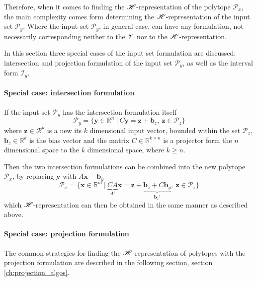 Therefore, when it comes to finding the $\mathscr{H}$-representation of the polytope $\mathcal{P}_x$, the main complexity comes form determining the $\mathscr{H}$-representation of the input set $\mathcal{P}_y$. Where the input set $\mathcal{P}_y$, in general case, can have any formulation, not necessarily corresponding neither to the $\mathscr{V}$ nor to the $\mathscr{H}$-representation.

In this section three special cases of the input set formulation are discussed: intersection and projection formulation of the input set $\mathcal{P}_y$, as well as the interval form $\mathcal{I}_y$.

\paragraph*{Special case: intersection formulation} If the input set $\mathcal{P}_y$ has the intersection formulation itself
\begin{equation}
    \mathcal{P}_y=\{\bm{y}\in  \mathbb{R}^n~|~ C\bm{y}=\bm{z} + \bm{b}_z, ~ \bm{z} \in \mathcal{P}_z \}
\end{equation}
where $\bm{z}\in\mathcal{R}^k$ is a new its $k$ dimensional input vector, bounded within the set $\mathcal{P}_z$, $\bm{b}_z\in\mathbb{R}^k$ is the bias vector and the matrix $C\in \mathbb{R}^{k\times n}$ is a projector form the $n$ dimensional space to the $k$ dimensional space, where $k\geq n$.

Then the two intersection formulations can be combined into the new polytope $\mathcal{P}_x$, by replacing $\bm{y}$ with $A\bm{x}- \bm{b}_y$
\begin{equation}
    \mathcal{P}_x=\{\bm{x}\in  \mathbb{R}^m~|~ \underbrace{CA}_{A'}\bm{x}=\bm{z} + \underbrace{\bm{b}_z + C\bm{b}_y}_{\bm{b}_z'}, ~ \bm{z} \in \mathcal{P}_z \}
\end{equation}
which $\mathscr{H}$-representation can then be obtained in the same manner as described above.

\paragraph*{Special case: projection formulation} The common strategies for finding the $\mathscr{H}$-representation of polytopes with the projection formulation are described in the following section, section \ref{ch:projection_algos}.

